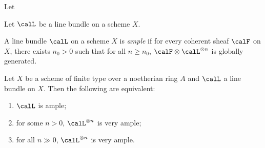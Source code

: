     \begin{example}\label{eg:multiple_of_globally_generated_line_bundle_is_globally_generated}
        Let 
    \end{example}

    \begin{example}\label{eg:product_of_pullback_along_natural_projection_is_globally_generated}
        
    \end{example}

    \begin{definition}\label{def:base_locus_and_base_idea}
        Let \(\calL\) be a line bundle on a scheme \(X\).
    \end{definition}


    \begin{definition}\label{def:ample_line_bundle}
        A line bundle \(\calL\) on a scheme \(X\) is \emph{ample} if for every coherent sheaf \(\calF\) on \(X\), there exists \(n_0>0\) such that for all \(n\ge n_0\), \(\calF\otimes \calL^{\otimes n}\) is globally generated.
    \end{definition}

    





    \begin{theorem}\label{thm:ample_very_ample}
        Let \(X\) be a scheme of finite type over a noetherian ring \(A\) and \(\calL\) a line bundle on \(X\).
        Then the following are equivalent:
        \begin{enumerate}
            \item \(\calL\) is ample;
            \item for some \(n>0\), \(\calL^{\otimes n}\) is very ample;
            \item for all \(n \gg 0\), \(\calL^{\otimes n}\) is very ample.
        \end{enumerate}
    \end{theorem}

